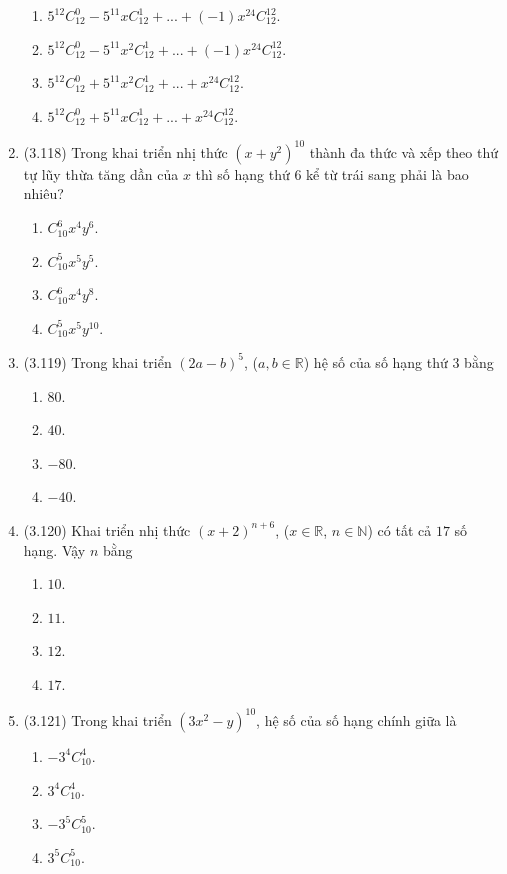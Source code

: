 \begin{enumerate}[label=\textbf{Câu \arabic*.},align=left,left=0cm..0cm,itemindent=*]
\begin{enumerate}[label=\textbf{\Alph*.},align=left,left=1cm..0cm,itemindent=*]
	    \item $5^{12}C_{12}^0-5^{11}xC_{12}^1+...+(-1)x^{24}C_{12}^{12}$.
	    \item $5^{12}C_{12}^0-5^{11}x^2C_{12}^1+...+ \left(-1\right) x^{24}C_{12}^{12}$.
	    \item $5^{12}C_{12}^0+5^{11}x^2C_{12}^1+...+x^{24}C_{12}^{12}$.
	    \item $5^{12}C_{12}^0+5^{11}xC_{12}^1+...+x^{24}C_{12}^{12}$.
	\end{enumerate}
	\item (3.118) Trong khai triển nhị thức $\left(x+y^2\right)^{10}$ thành đa thức và xếp theo thứ tự lũy thừa tăng dần của $x$ thì số hạng thứ 6 kể từ trái sang phải là bao nhiêu?
	\begin{enumerate}[label=\textbf{\Alph*.},align=left,left=1cm..0cm,itemindent=*]
	    \item $C_{10}^6x^4y^6$. \item $C_{10}^5x^5y^5$. \item $C_{10}^6x^4y^8$. \item $C_{10}^5x^5y^{10}$.
	\end{enumerate}
	\item (3.119) Trong khai triển $(2a-b)^5$, ($a,b\in\mathbb{R}$) hệ số của số hạng thứ 3 bằng
	\begin{enumerate}[label=\textbf{\Alph*.},align=left,left=1cm..0cm,itemindent=*]
	    \item $80$. \item $40$. \item $-80$. \item $-40$.
	\end{enumerate}
	\item (3.120) Khai triển nhị thức $(x+2)^{n+6}$, ($x\in\mathbb{R}$, $n\in\mathbb{N}$) có tất cả $17$ số hạng. Vậy $n$ bằng
	\begin{enumerate}[label=\textbf{\Alph*.},align=left,left=1cm..0cm,itemindent=*]
	    \item $10$. \item $11$. \item $12$. \item $17$.
	\end{enumerate}
	\item (3.121) Trong khai triển $\left(3x^2-y\right)^{10}$, hệ số của số hạng chính giữa là
	\begin{enumerate}[label=\textbf{\Alph*.},align=left,left=1cm..0cm,itemindent=*]
	    \item $-3^4C_{10}^4$. \item $3^4C_{10}^4$. \item $-3^5C_{10}^5$. \item $3^5C_{10}^5$.

\end{enumerate}
\end{enumerate}
